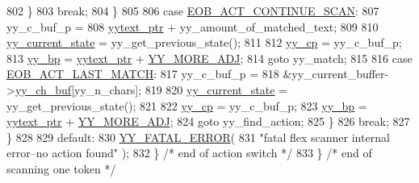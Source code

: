\begin{DoxyCode}
802                                         \}
803                                 \textcolor{keywordflow}{break};
804                                 \}
805 
806                         \textcolor{keywordflow}{case} \mbox{\hyperlink{expr-lex_8cpp_adf4b0db227e07782e28ade353a7ba7a1}{EOB\_ACT\_CONTINUE\_SCAN}}:
807                                 yy\_c\_buf\_p =
808                                         \mbox{\hyperlink{expr-lex_8cpp_a790a191a93ef4d3b8c0bb43fd7480052}{yytext\_ptr}} + yy\_amount\_of\_matched\_text;
809 
810                                 \mbox{\hyperlink{expr-lex_8cpp_abb8b9672f94e21056888ae611b41cd1b}{yy\_current\_state}} = yy\_get\_previous\_state();
811 
812                                 \mbox{\hyperlink{expr-lex_8cpp_aebf8322d98e81db5af081bb22a5f06fe}{yy\_cp}} = yy\_c\_buf\_p;
813                                 \mbox{\hyperlink{expr-lex_8cpp_a71cf769ce518e8687bf8999b278c65f4}{yy\_bp}} = \mbox{\hyperlink{expr-lex_8cpp_a790a191a93ef4d3b8c0bb43fd7480052}{yytext\_ptr}} + \mbox{\hyperlink{expr-lex_8cpp_a68792d73820bc46a71d3d4e613f0b977}{YY\_MORE\_ADJ}};
814                                 \textcolor{keywordflow}{goto} yy\_match;
815 
816                         \textcolor{keywordflow}{case} \mbox{\hyperlink{expr-lex_8cpp_ad1a0b5ebcabffe388e9e9ebb2619c1fb}{EOB\_ACT\_LAST\_MATCH}}:
817                                 yy\_c\_buf\_p =
818                                 &yy\_current\_buffer->\mbox{\hyperlink{structyy__buffer__state_ad7b8df8d8a4688e57b0b8d3ca75adc85}{yy\_ch\_buf}}[yy\_n\_chars];
819 
820                                 \mbox{\hyperlink{expr-lex_8cpp_abb8b9672f94e21056888ae611b41cd1b}{yy\_current\_state}} = yy\_get\_previous\_state();
821 
822                                 \mbox{\hyperlink{expr-lex_8cpp_aebf8322d98e81db5af081bb22a5f06fe}{yy\_cp}} = yy\_c\_buf\_p;
823                                 \mbox{\hyperlink{expr-lex_8cpp_a71cf769ce518e8687bf8999b278c65f4}{yy\_bp}} = \mbox{\hyperlink{expr-lex_8cpp_a790a191a93ef4d3b8c0bb43fd7480052}{yytext\_ptr}} + \mbox{\hyperlink{expr-lex_8cpp_a68792d73820bc46a71d3d4e613f0b977}{YY\_MORE\_ADJ}};
824                                 \textcolor{keywordflow}{goto} yy\_find\_action;
825                         \}
826                 \textcolor{keywordflow}{break};
827                 \}
828 
829         \textcolor{keywordflow}{default}:
830                 \mbox{\hyperlink{expr-lex_8cpp_ac0586b8b0b092d02f4ba7d45abe328f2}{YY\_FATAL\_ERROR}}(
831                         \textcolor{stringliteral}{"fatal flex scanner internal error--no action found"} );
832         \} \textcolor{comment}{/* end of action switch */}
833                 \} \textcolor{comment}{/* end of scanning one token */}
\end{DoxyCode}
